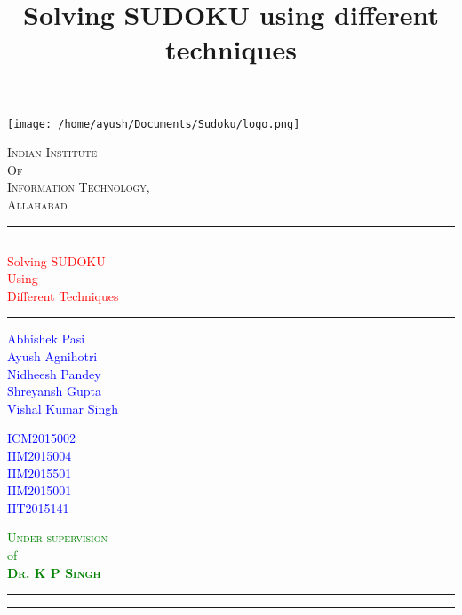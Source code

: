 \documentclass[11pt]{article}
\title{\textbf{Solving SUDOKU using different techniques}}
\date{}
\begin{document}
\begin{titlepage}
	\centering
	\texttt{[image: /home/ayush/Documents/Sudoku/logo.png]}\\[.5cm]
	{\scshape\LARGE Indian Institute \\Of \\Information Technology,\\ Allahabad \par}
	\vspace{1cm}
	\rule{\textwidth}{1pt}	
	\vspace{2pt}\vspace{-\baselineskip}
	\rule{\textwidth}{0.4pt}
	\vspace{0.1\textheight}
		
	\textcolor{red}{ 
		{\Huge Solving SUDOKU}\\[0.5\baselineskip]
		{\Large Using}\\[0.5\baselineskip]
		{\Huge Different Techniques}
	}
	
	\vspace{0.055\textheight} 
	
	\rule{0.3\textwidth}{0.4pt} 
	\begin{multicols}{3} 
	\textcolor{blue}{
		\begin{flushleft} 
		{\large Abhishek Pasi}\\[5pt] 
		{\large Ayush Agnihotri}\\[5pt]
		{\large Nidheesh Pandey}\\[5pt]
		{\large Shreyansh Gupta}\\[5pt]
		{\large Vishal Kumar Singh}\\[5pt]
		\end{flushleft}
		}
		\columnbreak
		 
	\textcolor{blue}{
		\begin{flushleft} 
		{\large ICM2015002}\\[5pt] 
		{\large IIM2015004}\\[5pt]
		{\large IIM2015501}\\[5pt]
		{\large IIM2015001}\\[5pt]
		{\large IIT2015141}\\[5pt]
		\end{flushleft}
		}
		\columnbreak

	\textcolor{green}{
		\begin{flushright}
		{\Large \textsc{Under supervision}}\\
		{\large of}\\
		{\Large \textsc{\textbf{Dr. K P Singh}}}
		\end{flushright}
		}
	\end{multicols}
	
\hfill
		
	\rule{\textwidth}{0.4pt} %
	
	\vspace{2pt}\vspace{-\baselineskip} %
	
	\rule{\textwidth}{2pt} %
	
\end{titlepage}
\end{document}
